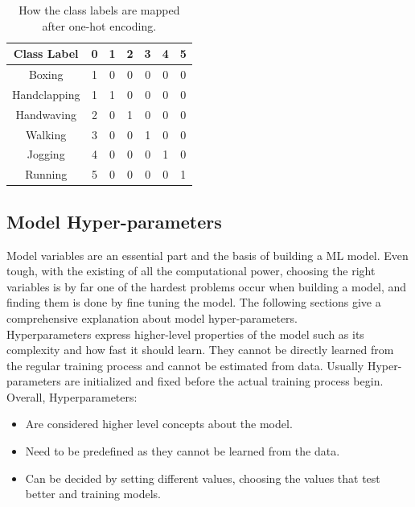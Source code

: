 \begin{table}[]
\centering
\begin{tabular}{|c|c|c|c|c|c|c|}
\hline
\textbf{Class Label} & \textbf{0} & \textbf{1} & \textbf{2} & \textbf{3} & \textbf{4} & \textbf{5} \\ \hline
Boxing               & 1          & 0          & 0          & 0          & 0          & 0          \\ \hline
Handclapping         & 1          & 1          & 0          & 0          & 0          & 0          \\ \hline
Handwaving           & 2          & 0          & 1          & 0          & 0          & 0          \\ \hline
Walking              & 3          & 0          & 0          & 1          & 0          & 0          \\ \hline
Jogging              & 4          & 0          & 0          & 0          & 1          & 0          \\ \hline
Running              & 5          & 0          & 0          & 0          & 0          & 1          \\ \hline
\end{tabular}
\caption{How the class labels are mapped after one-hot encoding.}
\label{my-label}
\end{table}

\subsection{Model Hyper-parameters}
\hspace{5mm} Model variables are an essential part and the basis of building a ML model. Even tough, with the existing of all the computational power, choosing the right variables is by far one of the hardest problems occur when building a model, and finding them is done by fine tuning the model. The following sections give a comprehensive explanation about model hyper-parameters.\\

Hyperparameters express higher-level properties of the model such as its complexity and how fast it should learn. They cannot be directly learned from the regular training process and cannot be estimated from data. Usually Hyper-parameters are initialized and fixed before the actual training process begin.\\

Overall, Hyperparameters:
\begin{itemize}
\item Are considered higher level concepts about the model.
\item Need to be predefined as they cannot be learned from the data.
\item Can be decided by setting different values, choosing the values that test better and training models.
\end{itemize}\\

